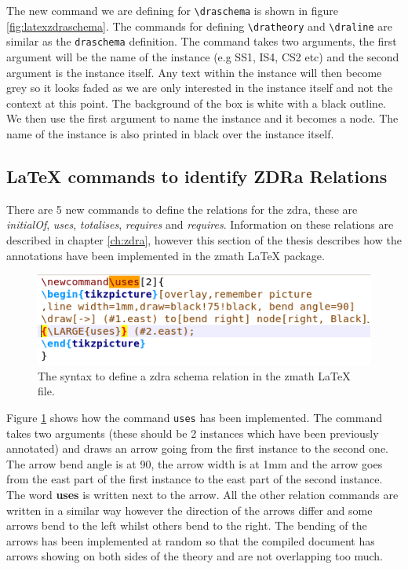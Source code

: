 The new command we are defining for \verb|\draschema| is shown in figure
\ref{fig:latexzdraschema}. The commands for defining \verb|\dratheory| and
\verb|\draline| are similar as the \verb|draschema| definition. The command
takes two arguments, the first argument will be the name of the instance (e.g
SS1, IS4, CS2 etc) and the second argument is the instance itself. Any text
within the instance will then become grey so it looks faded as we are only
interested in the instance itself and not the context at this point. The
background of the box is white with a black outline. We then use the first
argument to name the instance and it becomes a node. The name of the instance is
also printed in black over the instance itself.

\subsection{\LaTeX{} commands to identify ZDRa Relations}

There are 5 new commands to define the relations for the \gls{zdra}, these are
\emph{initialOf}, \emph{uses}, \emph{totalises}, \emph{requires} and
\emph{requires}. Information on these relations are described in chapter
\ref{ch:zdra}, however this section of the thesis describes how the annotations
have been implemented in the \gls{zmath} \LaTeX{} package.

\begin{figure}[H]
\includegraphics[scale=0.7]{Figures/Design/zmathd.png}
\caption{The syntax to define a \gls{zdra} schema relation in the \gls{zmath} \LaTeX{} file. \label{fig:latexzdrauses}}
\end{figure}

Figure \ref{fig:latexzdrauses} shows how the command \verb|uses| has been
implemented. The command takes two arguments (these should be 2 instances which have
been previously annotated) and draws an arrow going from the first instance to
the second one. The arrow bend angle is at 90, the arrow width is at 1mm and the
arrow goes from the east part of the first instance to the east part of the
second instance. The word \textbf{uses} is written next to the arrow. All the
other relation commands are written in a similar way however the direction of
the arrows differ and some arrows bend to the left whilst others bend to the
right. The bending of the arrows has been implemented at random so that the
compiled document has arrows showing on both sides of the theory and are not
overlapping too much.

